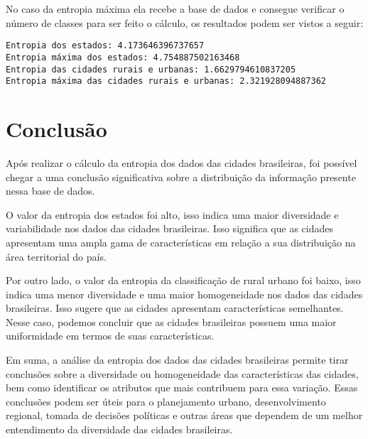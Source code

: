 \documentclass{article}
\begin{document}
No caso da entropia máxima ela recebe a base de dados e consegue verificar o número de classes para ser feito o cálculo, os resultados podem ser vistos a seguir:

\begin{verbatim}
Entropia dos estados: 4.173646396737657
Entropia máxima dos estados: 4.754887502163468
Entropia das cidades rurais e urbanas: 1.6629794610837205
Entropia máxima das cidades rurais e urbanas: 2.321928094887362
\end{verbatim}
\section{Conclusão}

Após realizar o cálculo da entropia dos dados das cidades brasileiras, foi possível chegar a uma conclusão significativa sobre a distribuição da informação presente nessa base de dados.

 O valor da entropia dos estados foi alto, isso indica uma maior diversidade e variabilidade nos dados das cidades brasileiras. Isso significa que as cidades apresentam uma ampla gama de características em relação a sua distribuição na área territorial do país. 

Por outro lado, o valor da entropia da classificação de rural urbano foi baixo, isso indica uma menor diversidade e uma maior homogeneidade nos dados das cidades brasileiras. Isso sugere que as cidades apresentam características semelhantes. Nesse caso, podemos concluir que as cidades brasileiras possuem uma maior uniformidade em termos de suas características.

Em suma, a análise da entropia dos dados das cidades brasileiras permite tirar conclusões sobre a diversidade ou homogeneidade das características das cidades, bem como identificar os atributos que mais contribuem para essa variação. Essas conclusões podem ser úteis para o planejamento urbano, desenvolvimento regional, tomada de decisões políticas e outras áreas que dependem de um melhor entendimento da diversidade das cidades brasileiras.




\end{document}
